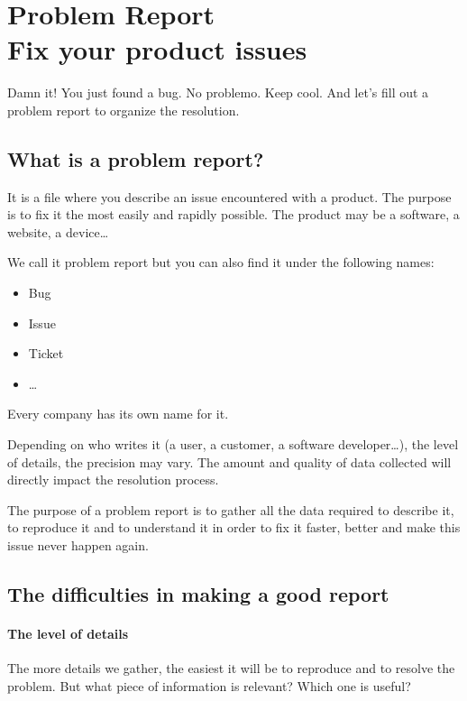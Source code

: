 \setchapterpreamble[u]{\margintoc}
\chapter{Problem Report\\Fix your product issues}
\label{sec:ProblemReport}

Damn it! You just found a bug. No problemo. Keep cool. And let’s fill out a problem report to organize the resolution.

\section{What is a problem report?}

It is a file where you describe an issue encountered with a product. The purpose is to fix it the most easily and rapidly possible. The product may be a software, a website, a device…

We call it problem report but you can also find it under the following names:

\begin{itemize}
    \item Bug
    \item Issue
    \item Ticket
    \item …
\end{itemize}

Every company has its own name for it.

Depending on who writes it (a user, a customer, a software developer…), the level of details, the precision may vary. The amount and quality of data collected will directly impact the resolution process.

The purpose of a problem report is to gather all the data required to describe it, to reproduce it and to understand it in order to fix it faster, better and make this issue never happen again.

\section{The difficulties in making a good report}

\subsubsection{The level of details}

The more details we gather, the easiest it will be to reproduce and to resolve the problem. But what piece of information is relevant? Which one is useful?

